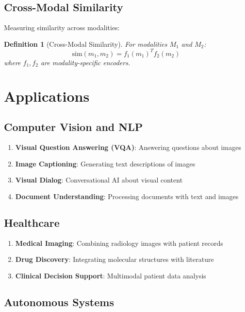 \documentclass[11pt,a4paper]{article}
\newtheorem{definition}[theorem]{Definition}
\begin{document}
\subsection{Cross-Modal Similarity}

Measuring similarity across modalities:

\begin{definition}[Cross-Modal Similarity]
For modalities $M_1$ and $M_2$:
$$\text{sim}(m_1, m_2) = f_1(m_1)^T f_2(m_2)$$
where $f_1, f_2$ are modality-specific encoders.
\end{definition}

\section{Applications}

\subsection{Computer Vision and NLP}

\begin{enumerate}
\item \textbf{Visual Question Answering (VQA)}: Answering questions about images
\item \textbf{Image Captioning}: Generating text descriptions of images
\item \textbf{Visual Dialog}: Conversational AI about visual content
\item \textbf{Document Understanding}: Processing documents with text and images
\end{enumerate}

\subsection{Healthcare}

\begin{enumerate}
\item \textbf{Medical Imaging}: Combining radiology images with patient records
\item \textbf{Drug Discovery}: Integrating molecular structures with literature
\item \textbf{Clinical Decision Support}: Multimodal patient data analysis
\end{enumerate}

\subsection{Autonomous Systems}
\end{document}
